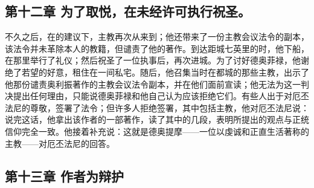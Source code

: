 \subsection{第十二章 为了取悦，在未经许可执行祝圣。}

不久之后，在的建议下，主教再次从来到；他还带来了一份主教会议法令的副本，该法令并未革除本人的教籍，但谴责了他的著作。到达距城七英里的时，他下船，在那里举行了礼仪；然后祝圣了一位执事后，再次进城。为了讨好德奥菲禄，他谢绝了若望的好意，租住在一间私宅。随后，他召集当时在都城的那些主教，出示了他那份谴责奥利振著作的主教会议法令副本，并在他们面前宣读；他无法为这一判决提出任何理由，只能说德奥菲禄和他自己认为应该拒绝它们。有些人出于对厄丕法尼的尊敬，签署了法令；但许多人拒绝签署，其中包括主教，他对厄丕法尼说：说完这话，他拿出该作者的一部著作，读了其中的几段，表明所提出的观点与正统信仰完全一致。他接着补充说：这就是德奥提摩——一位以虔诚和正直生活著称的主教——对厄丕法尼的回答。\par


\subsection{第十三章 作者为辩护}

